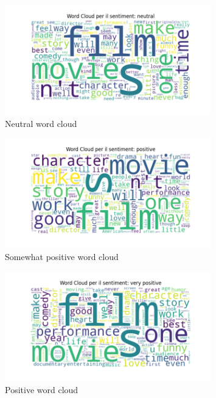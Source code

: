 \begin{figure}[H]
	\centering
	\includegraphics[width=0.8\textwidth]{figures/wordcloud_neutral.png}
	\caption{Neutral word cloud}
	\label{fig:neutral_word_cloud}
\end{figure}

\begin{figure}[H]
	\centering
	\includegraphics[width=0.8\textwidth]{figures/wordcloud_spositive.png}
	\caption{Somewhat positive word cloud}
	\label{fig:somewhat_positive_word_cloud}
\end{figure}

\begin{figure}[H]
	\centering
	\includegraphics[width=0.8\textwidth]{figures/wordcloud_positive.png}
	\caption{Positive word cloud}
	\label{fig:positive_word_cloud}
\end{figure}
